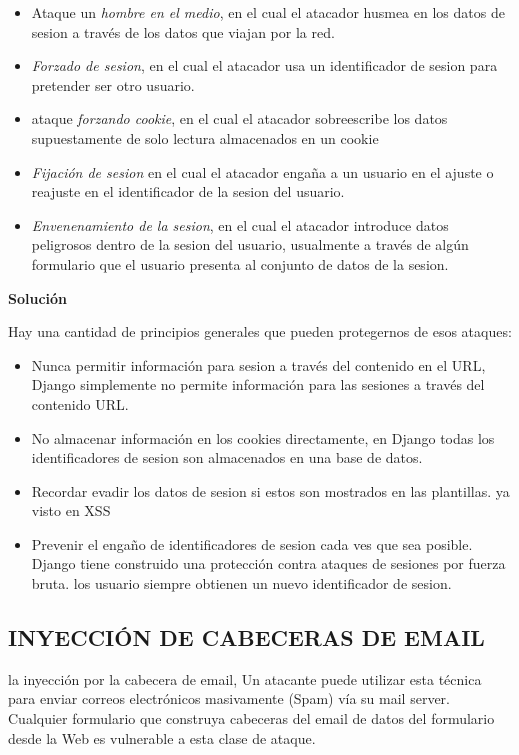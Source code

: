 \begin{itemize}
 \item Ataque un \textit{hombre en el medio}, en el cual el atacador husmea en los datos de sesion a través de los datos que viajan por la red.
 \item \textit{Forzado de sesion}, en el cual el atacador usa un identificador de sesion para pretender ser otro usuario.
 \item ataque \textit{forzando cookie}, en el cual el atacador sobreescribe los datos supuestamente de solo lectura almacenados en un cookie
 \item \textit{Fijación de sesion} en el cual el atacador engaña a un usuario en el ajuste o reajuste en el identificador de la sesion del usuario.
 \item \textit{Envenenamiento de la sesion}, en el cual el atacador introduce datos peligrosos dentro de la sesion del usuario, usualmente a través de algún formulario que el usuario presenta al conjunto de datos de la sesion.
\end{itemize}

\textbf{Solución}

Hay una cantidad de principios generales que pueden protegernos de esos ataques:

\begin{itemize}
 \item Nunca permitir información para sesion a través del contenido en el URL, Django simplemente no permite información para las sesiones a través del contenido URL.
 \item No almacenar información en los cookies directamente, en Django todas los identificadores de sesion son almacenados en una base de datos.
 \item Recordar evadir los datos de sesion si estos son mostrados en las plantillas. ya visto en XSS
 \item Prevenir el engaño de identificadores de sesion cada ves que sea posible. Django tiene construido una protección contra ataques de sesiones por fuerza bruta. los usuario siempre obtienen un nuevo identificador de sesion. 
\end{itemize}

\subsection{INYECCIÓN DE CABECERAS DE EMAIL}

la inyección por la cabecera de email, Un atacante puede utilizar esta técnica para enviar correos electrónicos masivamente (Spam) vía su mail server. Cualquier formulario que construya cabeceras del email de datos del formulario desde la Web es vulnerable a esta clase de ataque.

